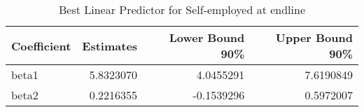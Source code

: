 \begin{table}

\caption{\label{tab:Qselfempl}Best Linear Predictor for Self-employed at endline}
\centering
\begin{tabular}[t]{lrrr}
\toprule
Coefficient & Estimates & Lower Bound 90\% & Upper Bound 90\%\\
\midrule
beta1 & 5.8323070 & 4.0455291 & 7.6190849\\
beta2 & 0.2216355 & -0.1539296 & 0.5972007\\
\bottomrule
\end{tabular}
\end{table}
